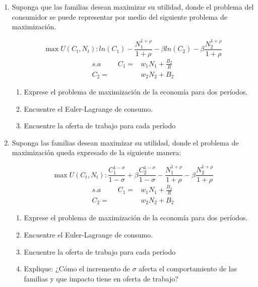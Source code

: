 \documentclass[a4paper,12pt]{article}
\begin{document}
\begin{enumerate}

\item Suponga que las familias desean maximizar su utilidad, donde el problema del consumidor se puede representar por medio del siguiente problema de maximización.

\begin{equation*}
\max U(C_t,N_t): ln (C_1)- \frac{N_1^{1+\rho}}{1+\rho} - \beta ln (C_2) -\beta \frac{ N_2^{1+\rho}}{1+\rho} 
\end{equation*}
\begin{align*}
    s.a \hspace{1cm} C_1=&w_1 N_1 + \frac{B_2}{R}\\
     C_2=&w_2 N_2 + B_2
\end{align*}

\begin{enumerate}[label=\alph*)]
    \item Exprese el problema de maximización de la economía para dos períodos.
    \item Encuentre el Euler-Lagrange de consumo.
    \item Encuentre la oferta de trabajo para cada período
\end{enumerate}


\item Suponga las familias desean maximizar su utilidad, donde el problema de maximización queda expresado de la siguiente manera:

\begin{equation*}
\max U(C_t,N_t):  \frac{C_{1}^{1-\sigma}}{1-\sigma} + \beta  \frac{C_{2}^{1-\sigma}}{1-\sigma}
-\frac{N_{1}^{1+\rho}}{1+\rho} - \beta \frac{N_2^{1+\rho}}{1+\rho}      
\end{equation*}
\begin{align*}
    s.a \hspace{1cm} C_1=&w_1 N_1 + \frac{B_2}{R}\\
     C_2=&w_2 N_2 + B_2
\end{align*}

\begin{enumerate}[label=\alph*)]
    \item Exprese el problema de maximización de la economía para dos períodos.
    \item Encuentre el Euler-Lagrange de consumo.
    \item Encuentre la oferta de trabajo para cada período
    \item  Explique: ¿Cómo el incremento de $\sigma$ afecta el comportamiento de las familias y que impacto tiene en oferta de trabajo?
\end{enumerate}


\end{enumerate}
\end{document}
